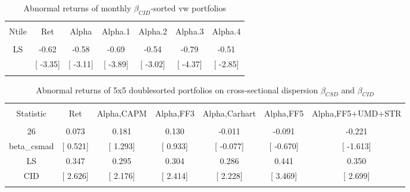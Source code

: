 \documentclass[16pt]{article}
\begin{document}
\begin{table}[!htbp] \centering 
  \caption{Abnormal returns of monthly $\beta_{CID}$-sorted vw portfolios} 
  \label{} 
\begin{tabular}{@{\extracolsep{5pt}} ccccccc} 
\\[-1.8ex]\hline 
\hline \\[-1.8ex] 
Ntile & Ret & Alpha & Alpha.1 & Alpha.2 & Alpha.3 & Alpha.4 \\ 
\hline \\[-1.8ex] 
LS & -0.62 & -0.58 & -0.69 & -0.54 & -0.79 & -0.51 \\ 
 & [ -3.35] & [ -3.11] & [ -3.89] & [ -3.02] & [ -4.37] & [ -2.85] \\ 
\hline \\[-1.8ex] 
\end{tabular} 
\end{table}

\begin{table}[!htbp] \centering 
  \caption{Abnormal returns of 5x5 doublesorted portfolios on cross-sectional dispersion $\beta_{CSD}$ and $\beta_{CID}$} 
  \label{} 
\begin{tabular}{@{\extracolsep{5pt}} ccccccc} 
\\[-1.8ex]\hline 
\hline \\[-1.8ex] 
Statistic & Ret & Alpha,CAPM & Alpha,FF3 & Alpha,Carhart & Alpha,FF5 & Alpha,FF5+UMD+STR \\ 
\hline \\[-1.8ex] 
26 & 0.073 & 0.181 & 0.130 & -0.011 & -0.091 & -0.221 \\ 
beta\_csmad & [ 0.521] & [ 1.293] & [ 0.933] & [ -0.077] & [ -0.670] & [ -1.613] \\ 
LS & 0.347 & 0.295 & 0.304 & 0.286 & 0.441 & 0.350 \\ 
CID & [ 2.626] & [ 2.176] & [ 2.414] & [ 2.228] & [ 3.469] & [ 2.699] \\ 
\hline \\[-1.8ex] 
\end{tabular} 
\end{table}
\end{document}
